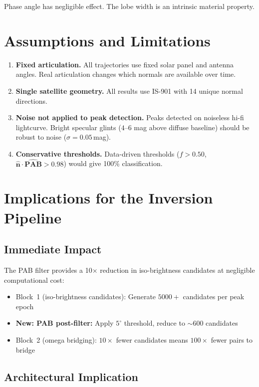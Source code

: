 \documentclass[11pt,a4paper]{article}
\begin{document}
Phase angle has negligible effect. The lobe width is an intrinsic material property.

\section{Assumptions and Limitations}

\begin{enumerate}[leftmargin=2em]
  \item \textbf{Fixed articulation.} All trajectories use fixed solar panel and antenna angles. Real articulation changes which normals are available over time.
  \item \textbf{Single satellite geometry.} All results use IS-901 with 14 unique normal directions.
  \item \textbf{Noise not applied to peak detection.} Peaks detected on noiseless hi-fi lightcurve. Bright specular glints ($4$--$6$ mag above diffuse baseline) should be robust to noise ($\sigma = 0.05$\,mag).
  \item \textbf{Conservative thresholds.} Data-driven thresholds ($f > 0.50$, $\hat{\mathbf{n}}\cdot\hat{\mathbf{PAB}} > 0.98$) would give 100\% classification.
\end{enumerate}

\section{Implications for the Inversion Pipeline}

\subsection{Immediate Impact}

The PAB filter provides a 10$\times$ reduction in iso-brightness candidates at negligible computational cost:
\begin{itemize}[leftmargin=2em]
  \item Block~1 (iso-brightness candidates): Generate $5000+$ candidates per peak epoch
  \item \textbf{New: PAB post-filter:} Apply $5^\circ$ threshold, reduce to ${\sim}600$ candidates
  \item Block~2 (omega bridging): $10\times$ fewer candidates means $100\times$ fewer pairs to bridge
\end{itemize}

\subsection{Architectural Implication}
\end{document}
